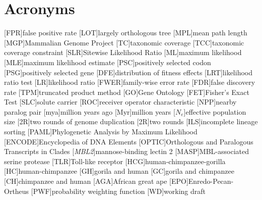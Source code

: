 \section*{Acronyms}
\label{Acronyms}
\begin{acronym}[TDMA]

[FPR]{false positive rate}
[LOT]{largely orthologous tree}
[MPL]{mean path length}
[MGP]{Mammalian Genome Project}
[TC]{taxonomic coverage}
[TCC]{taxonomic coverage constraint}
[SLR]{Sitewise Likelihood Ratio}
[ML]{maximum likelihood}
[MLE]{maximum likelihood estimate}
[PSC]{positively selected codon}
[PSG]{positively selected gene}
[DFE]{distribution of fitness effects}
[LRT]{likelihood ratio test}
[LR]{likelihood ratio}
[FWER]{family-wise error rate}
[FDR]{false discovery rate}
[TPM]{truncated product method}
[GO]{Gene Ontology}
[FET]{Fisher's Exact Test}
[SLC]{solute carrier}
[ROC]{receiver operator characteristic}
[NPP]{nearby paralog pair}
[mya]{million years ago}
[Myr]{million years}
[$N_{e}$]{effective population size}
[2R]{two rounds of genome duplication}
[2R]{two rounds}
[ILS]{incomplete lineage sorting}
[PAML]{Phylogenetic Analysis by Maximum Likelihood}
[ENCODE]{Encyclopedia of DNA Elements}
[OPTIC]{Orthologous and Paralogous Transcripts in Clades}
[\emph{MBL2}]{mannose-binding lectin 2}
[MASP]{MBL-associated serine protease}
[TLR]{Toll-like receptor}
[HCG]{human-chimpanzee-gorilla}
[HC]{human-chimpanzee}
[GH]{gorila and human}
[GC]{gorila and chimpanzee}
[CH]{chimpanzee and human}
[AGA]{African great ape}
[EPO]{Enredo-Pecan-Ortheus}
[PWF]{probability weighting function}
[WD]{working draft}

\end{acronym}
